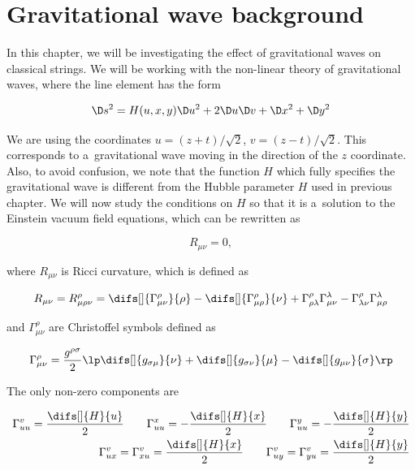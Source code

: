 \chapter{Gravitational wave background}

In this chapter, we will be investigating the effect of gravitational waves on classical strings. We will be working with the non-linear theory of gravitational waves, where the line element has the form \cite{jordan}

\begin{equation}
    \D s^2 = H(u, x, y) \D u^2 + 2 \D u \D v + \D x^2 + \D y^2
\end{equation}

\noindent
We are using the coordinates $u = (z+t)/\sqrt{2}$, $v = (z-t)/\sqrt{2}$. This corresponds to a~gravitational wave moving in the direction of the $z$ coordinate. Also, to avoid confusion, we note that the function $H$ which fully specifies the gravitational wave is different from the Hubble parameter $H$ used in previous chapter. We will now study the conditions on $H$ so that it is a~solution to the Einstein vacuum field equations, which can be rewritten as

\begin{equation}
\label{eq:einsten}
    R_{\mu \nu} = 0,
\end{equation}

\noindent
where $R_{\mu \nu}$ is Ricci curvature, which is defined as

\begin{equation}
    R_{\mu \nu} = R^{\rho}_{\mu \rho \nu} = \difs[]{\Gamma^{\rho}_{\mu \nu}}{\rho} - \difs[]{\Gamma^{\rho}_{\mu \rho}}{\nu} + \Gamma^{\rho}_{\rho \lambda} \Gamma^{\lambda}_{\mu \nu} - \Gamma^{\rho}_{\lambda \nu} \Gamma^{\lambda}_{\mu \rho}
\end{equation}

\noindent
and $\Gamma^{\rho}_{\mu \nu}$ are Christoffel symbols defined as

\begin{equation}
    \Gamma^{\rho}_{\mu \nu} = \frac{g^{\rho \sigma}}{2} \lp \difs[]{g_{\sigma \mu}}{\nu} + \difs[]{g_{\sigma \nu}}{\mu} - \difs[]{g_{\mu \nu}}{\sigma} \rp
\end{equation}

\noindent
The only non-zero components are

\begin{equation}
\begin{aligned}
    \Gamma^{v}_{u u} = \frac{\difs[]{H}{u}}{2} \qquad
    \Gamma^{x}_{u u} = - \frac{\difs[]{H}{x}}{2} \qquad
    \Gamma^{y}_{u u} = - \frac{\difs[]{H}{y}}{2} \\
    \Gamma^{v}_{u x} = \Gamma^{v}_{x u} = \frac{\difs[]{H}{x}}{2} \qquad  \Gamma^{v}_{u y} = \Gamma^{v}_{y u} = \frac{\difs[]{H}{y}}{2}
\end{aligned}
\end{equation}

